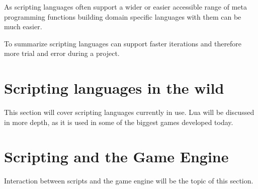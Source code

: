 \documentclass{article}
\begin{document}
As scripting languages often support a wider or easier accessible range of
meta programming functions building domain specific languages with them can be
much easier.

To summarize scripting languages can support faster iterations and
therefore more trial and error during a project.

\section{Scripting languages in the wild}
This section will cover scripting languages currently in use. Lua will be
discussed in more depth, as it is used in some of the biggest games developed
today.

\section{Scripting and the Game Engine}
Interaction between scripts and the game engine will be the topic of this
section.
\end{document}
